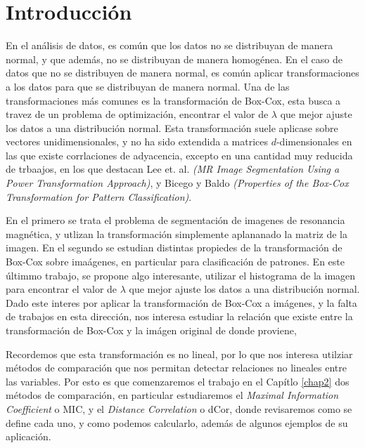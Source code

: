 \chapter{Introducci\'on}\label{chap1}

En el an\'alisis de datos, es com\'un que los datos no se distribuyan de manera normal, y que adem\'as, no se distribuyan de manera homog\'enea. En el caso de datos que no se distribuyen de manera normal, es com\'un aplicar transformaciones a los datos para que se distribuyan de manera normal. Una de las transformaciones m\'as comunes es la transformaci\'on de Box-Cox, esta busca a travez de un problema de optimizaci\'on, encontrar el valor de $\lambda$ que mejor ajuste los datos a una distribuci\'on normal. Esta transformaci\'on suele aplicase sobre  vectores unidimensionales, y no ha sido extendida a matrices $d$-dimensionales en las que existe corrlaciones de adyacencia, excepto en una cantidad muy reducida de trbaajos, en los que destacan Lee et. al. \textit{(MR Image Segmentation Using a Power Transformation Approach)}\cite{lee2009mr}, y Bicego y Baldo \textit{(Properties of the Box-Cox Transformation for Pattern Classification)}\cite{bicego2016}. 

En el primero se trata el problema de segmentaci\'on de imagenes de resonancia magn\'etica, y utlizan la transformaci\'on simplemente aplananado la matriz de la imagen. En el segundo se estudian distintas propiedes de la transformaci\'on de Box-Cox sobre ima\'agenes, en particular para clasificaci\'on de patrones. En este \' ultimmo trabajo, se propone algo interesante, utilizar el histograma de la imagen para encontrar el valor de $\lambda$ que mejor ajuste los datos a una distribuci\'on normal. Dado este interes por aplicar la transformaci\'on de Box-Cox a im\'agenes, y la falta de trabajos en esta direcci\'on, nos interesa estudiar la relaci\'on que existe entre la transformaci\'on de Box-Cox y la im\'agen original de donde proviene,

Recordemos que esta transformaci\'on es no lineal, por lo que nos interesa utilziar m\'etodos de comparaci\'on que nos permitan detectar relaciones no lineales entre las variables. Por esto es que comenzaremos el trabajo en el Cap\'itlo \ref{chap2} dos m\'etodos de comparaci\'on, en particular estudiaremos el \textit{Maximal Information Coefficient} o MIC, y el \textit{Distance Correlation} o dCor, donde revisaremos como se define cada uno, y como podemos calcularlo, adem\'as de algunos ejemplos de su aplicaci\'on.

